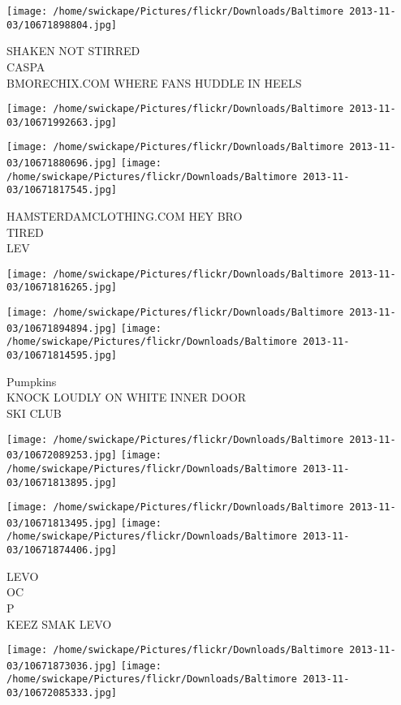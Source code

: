 \documentclass[10pt,letterpaper]{article}
\begin{document}
\texttt{[image: /home/swickape/Pictures/flickr/Downloads/Baltimore 2013-11-03/10671898804.jpg]}

SHAKEN NOT STIRRED\\
CASPA\\
BMORECHIX.COM WHERE FANS HUDDLE IN HEELS
\pagebreak

\texttt{[image: /home/swickape/Pictures/flickr/Downloads/Baltimore 2013-11-03/10671992663.jpg]}

\vspace{0.25in}
\texttt{[image: /home/swickape/Pictures/flickr/Downloads/Baltimore 2013-11-03/10671880696.jpg]}
\texttt{[image: /home/swickape/Pictures/flickr/Downloads/Baltimore 2013-11-03/10671817545.jpg]}

HAMSTERDAMCLOTHING.COM HEY BRO\\
TIRED\\
LEV
\pagebreak

\texttt{[image: /home/swickape/Pictures/flickr/Downloads/Baltimore 2013-11-03/10671816265.jpg]}

\vspace{0.25in}
\texttt{[image: /home/swickape/Pictures/flickr/Downloads/Baltimore 2013-11-03/10671894894.jpg]}
\texttt{[image: /home/swickape/Pictures/flickr/Downloads/Baltimore 2013-11-03/10671814595.jpg]}

Pumpkins\\
KNOCK LOUDLY ON WHITE INNER DOOR\\
SKI CLUB
\pagebreak

\texttt{[image: /home/swickape/Pictures/flickr/Downloads/Baltimore 2013-11-03/10672089253.jpg]}
\texttt{[image: /home/swickape/Pictures/flickr/Downloads/Baltimore 2013-11-03/10671813895.jpg]}

\texttt{[image: /home/swickape/Pictures/flickr/Downloads/Baltimore 2013-11-03/10671813495.jpg]}
\texttt{[image: /home/swickape/Pictures/flickr/Downloads/Baltimore 2013-11-03/10671874406.jpg]}

LEVO\\
OC\\
P\\
KEEZ SMAK LEVO
\pagebreak

\texttt{[image: /home/swickape/Pictures/flickr/Downloads/Baltimore 2013-11-03/10671873036.jpg]}
\texttt{[image: /home/swickape/Pictures/flickr/Downloads/Baltimore 2013-11-03/10672085333.jpg]}
\end{document}
